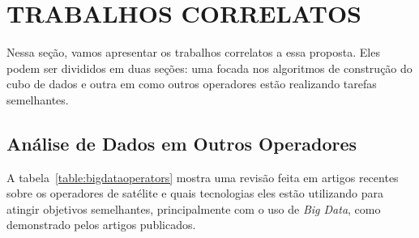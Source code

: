 
\chapter{TRABALHOS CORRELATOS}
\label{ch:corr}

Nessa seção, vamos apresentar os trabalhos correlatos a essa proposta. Eles podem ser divididos em duas seções: uma focada nos algoritmos de construção do cubo de dados e outra em como outros operadores estão realizando tarefas semelhantes.

\section{Análise de Dados em Outros Operadores}
\label{ch:corr:ops}

A tabela~\ref{table:bigdataoperators} mostra uma revisão feita em artigos recentes sobre os operadores de satélite e quais tecnologias eles estão utilizando para atingir objetivos semelhantes, principalmente com o uso de \textit{Big Data}, como demonstrado pelos artigos publicados.

